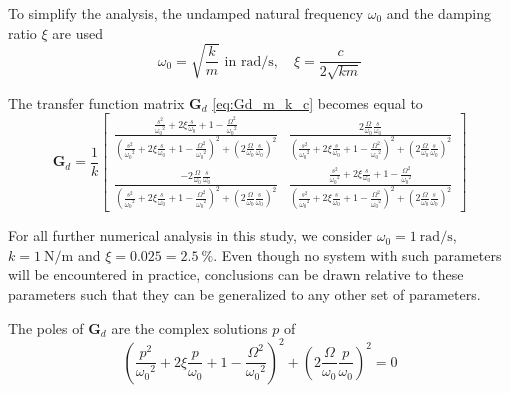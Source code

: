 \documentclass{ISMA_USD2020}
\begin{document}
To simplify the analysis, the undamped natural frequency \(\omega_0\) and the damping ratio \(\xi\) are used
\begin{equation}
  \omega_0 = \sqrt{\frac{k}{m}} \text{ in } \si{\radian\per\second}, \quad \xi = \frac{c}{2 \sqrt{k m}}
\end{equation}

The transfer function matrix \(\bm{G}_d\) \eqref{eq:Gd_m_k_c} becomes equal to
\begin{equation}
\label{eq:Gd_w0_xi_k}
\bm{G}_{d} =
  \frac{1}{k}
  \begin{bmatrix}
    \frac{\frac{s^2}{{\omega_0}^2} + 2 \xi \frac{s}{\omega_0} + 1 - \frac{{\Omega}^2}{{\omega_0}^2}}{\left( \frac{s^2}{{\omega_0}^2} + 2 \xi \frac{s}{\omega_0} + 1 - \frac{{\Omega}^2}{{\omega_0}^2} \right)^2 + \left( 2 \frac{\Omega}{\omega_0} \frac{s}{\omega_0} \right)^2} & \frac{2 \frac{\Omega}{\omega_0} \frac{s}{\omega_0}}{\left( \frac{s^2}{{\omega_0}^2} + 2 \xi \frac{s}{\omega_0} + 1 - \frac{{\Omega}^2}{{\omega_0}^2} \right)^2 + \left( 2 \frac{\Omega}{\omega_0} \frac{s}{\omega_0} \right)^2} \\
    \frac{- 2 \frac{\Omega}{\omega_0} \frac{s}{\omega_0}}{\left( \frac{s^2}{{\omega_0}^2} + 2 \xi \frac{s}{\omega_0} + 1 - \frac{{\Omega}^2}{{\omega_0}^2} \right)^2 + \left( 2 \frac{\Omega}{\omega_0} \frac{s}{\omega_0} \right)^2} & \frac{\frac{s^2}{{\omega_0}^2} + 2 \xi \frac{s}{\omega_0} + 1 - \frac{{\Omega}^2}{{\omega_0}^2}}{\left( \frac{s^2}{{\omega_0}^2} + 2 \xi \frac{s}{\omega_0} + 1 - \frac{{\Omega}^2}{{\omega_0}^2} \right)^2 + \left( 2 \frac{\Omega}{\omega_0} \frac{s}{\omega_0} \right)^2}
  \end{bmatrix}
\end{equation}

For all further numerical analysis in this study, we consider \(\omega_0 = \SI{1}{\radian\per\second}\), \(k = \SI{1}{\newton\per\meter}\) and \(\xi = 0.025 = \SI{2.5}{\percent}\).
Even though no system with such parameters will be encountered in practice, conclusions can be drawn relative to these parameters such that they can be generalized to any other set of parameters.

\par
The poles of \(\bm{G}_d\) are the complex solutions \(p\) of
\begin{equation}
  \left( \frac{p^2}{{\omega_0}^2} + 2 \xi \frac{p}{\omega_0} + 1 - \frac{{\Omega}^2}{{\omega_0}^2} \right)^2 + \left( 2 \frac{\Omega}{\omega_0} \frac{p}{\omega_0} \right)^2 = 0
\end{equation}
\end{document}

